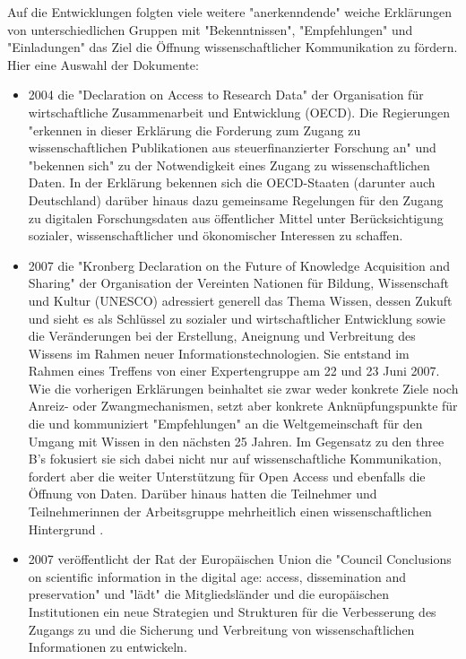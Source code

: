 Auf die Entwicklungen folgten viele weitere "anerkenndende" weiche Erklärungen von unterschiedlichen Gruppen mit "Bekenntnissen", "Empfehlungen" und "Einladungen" das Ziel die Öffnung wissenschaftlicher Kommunikation zu fördern. Hier eine Auswahl der Dokumente:
\begin{itemize}
\item 2004 die "Declaration on Access to Research Data" \cite{oecd_2004} der Organisation für wirtschaftliche Zusammenarbeit und Entwicklung (OECD). Die Regierungen "erkennen in dieser Erklärung die Forderung zum Zugang zu wissenschaftlichen Publikationen aus steuerfinanzierter Forschung an" und "bekennen sich" zu der Notwendigkeit eines Zugang zu wissenschaftlichen Daten. In der Erklärung bekennen sich die OECD-Staaten (darunter auch Deutschland) darüber hinaus dazu gemeinsame Regelungen für den Zugang zu digitalen Forschungsdaten aus öffentlicher Mittel unter Berücksichtigung sozialer, wissenschaftlicher und ökonomischer Interessen zu schaffen.
\item 2007 die "Kronberg Declaration on the Future of Knowledge Acquisition and Sharing" \cite{unesco_2007} der Organisation der Vereinten Nationen für Bildung, Wissenschaft und Kultur (UNESCO) adressiert generell das Thema Wissen, dessen Zukuft und sieht es als Schlüssel zu sozialer und wirtschaftlicher Entwicklung sowie die Veränderungen bei der Erstellung, Aneignung und Verbreitung des Wissens im Rahmen neuer Informationstechnologien. Sie entstand im Rahmen eines Treffens von einer Expertengruppe am 22 und 23 Juni 2007. Wie die vorherigen Erklärungen beinhaltet sie zwar weder konkrete Ziele noch Anreiz- oder Zwangmechanismen, setzt aber konkrete Anknüpfungspunkte für die und kommuniziert "Empfehlungen" an die Weltgemeinschaft für den Umgang mit Wissen in den nächsten 25 Jahren. Im Gegensatz zu den three B's fokusiert sie sich dabei nicht nur auf wissenschaftliche Kommunikation, fordert aber die weiter Unterstützung für Open Access und ebenfalls die Öffnung von Daten. Darüber hinaus hatten die Teilnehmer und Teilnehmerinnen der Arbeitsgruppe mehrheitlich einen wissenschaftlichen Hintergrund \cite{unesco_2007_list}.
\item 2007 veröffentlicht der Rat der Europäischen Union die "Council Conclusions on scientific information in the digital age: access, dissemination and preservation" \cite{eu_council_2007} und "lädt" die Mitgliedsländer und die europäischen Institutionen ein neue Strategien und Strukturen für die Verbesserung des Zugangs zu und die Sicherung und Verbreitung von wissenschaftlichen Informationen zu entwickeln.

\end{itemize}
